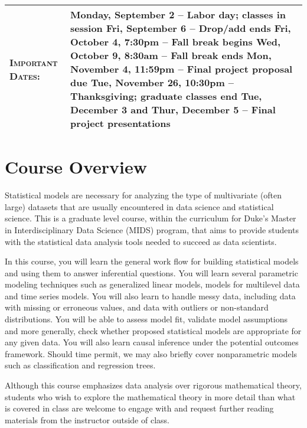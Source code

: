 \documentclass[11pt, a4paper]{article}
\begin{document}
\begin{center}
\begin{minipage}[t]{.9\textwidth}
\begin{tabular}{@{}L{3cm}L{12cm}}
\textsc{Important Dates:} & Monday, September 2 -- Labor day; classes in session \newline Fri, September 6 -- Drop/add ends \newline Fri, October 4, 7:30pm -- Fall break begins \newline Wed, October 9, 8:30am -- Fall break ends \newline Mon, November 4, 11:59pm -- Final project proposal due \newline Tue, November 26, 10:30pm -- Thanksgiving; graduate classes end \newline Tue, December 3 and Thur, December 5 -- Final project presentations \\
	 \bottomrule[0.065cm]
\end{tabular}
\end{minipage}
\end{center}


\vspace{.5cm}
\setlength{\unitlength}{1in}
\renewcommand{\arraystretch}{1.5}



\section{Course Overview}
Statistical models are necessary for analyzing the type of multivariate (often large) datasets that are usually encountered in data science and statistical science. This is a graduate level course, within the curriculum for Duke's Master in Interdisciplinary Data Science (MIDS) program, that aims to provide students with the statistical data analysis tools needed to succeed as data scientists. 

In this course, you will learn the general work flow for building statistical models and using them to answer inferential questions. You will learn several parametric modeling techniques such as generalized linear models, models for multilevel data and time series models. You will also learn to handle messy data, including data with missing or erroneous values, and data with outliers or non-standard distributions. You will be able to assess model fit, validate model assumptions and more generally, check whether proposed statistical models are appropriate for any given data. You will also learn causal inference under the potential outcomes framework. Should time permit, we may also briefly cover nonparametric models such as classification and regression trees. 

Although this course emphasizes data analysis over rigorous mathematical theory, students who wish to explore the mathematical theory in more detail than what is covered in class are welcome to engage with and request further reading materials from the instructor outside of class.
\end{document}
